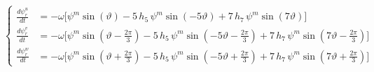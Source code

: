 \documentclass[12pt,a4paper]{scrartcl}
\begin{document}
\begin{onehalfspace}
\begin{equation}
	\left\lbrace 
	\begin{aligned}
			\frac{{d\psi_r^u}}{dt} &=-\omega \Bigg[\psi^m\sin \left( \vartheta \right) - 5\,h_{5}\,\psi^m\sin\left({-5\vartheta}\right) + 7\,h_{7}\,\psi^m\sin\left({7\vartheta}\right) \Bigg] \\[6pt]
		\frac{{d\psi_r^v}}{dt} &= -\omega \Bigg[\psi^m\sin\left(\vartheta - \frac{2\pi}{3}\right) - 5\,h_{5}\,\psi^m\sin\left({-5\vartheta-\frac{{2\pi}}{3}}\right) + 7\,h_{7}\,\psi^m\sin\left({7\vartheta-\frac{{2\pi}}{3}}\right)\Bigg] \\[6pt]
		\frac{{d\psi_r^w}}{dt} &=-\omega \Bigg[\psi^m\sin\left({\vartheta+\frac{{2\pi}}{3}}\right) - 5\,h_{5}\,\psi^m\sin\left({-5\vartheta+\frac{{2\pi}}{3}}\right) + 7\,h_{7}\,\psi^m\sin\left({7\vartheta+\frac{{2\pi}}{3}}\right)\Bigg]
	\end{aligned}
	\right. 
\end{equation}


\end{onehalfspace}
\end{document}
